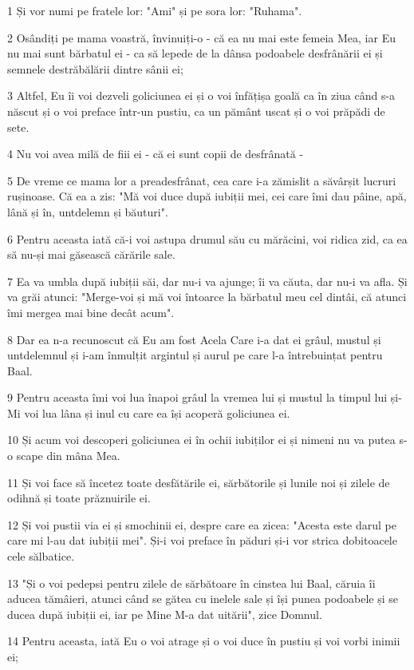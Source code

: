 \par 1 Și vor numi pe fratele lor: "Ami" și pe sora lor: "Ruhama".
\par 2 Osândiți pe mama voastră, învinuiți-o - că ea nu mai este femeia Mea, iar Eu nu mai sunt bărbatul ei - ca să lepede de la dânsa podoabele desfrânării ei și semnele destrăbălării dintre sânii ei;
\par 3 Altfel, Eu îi voi dezveli goliciunea ei și o voi înfățișa goală ca în ziua când s-a născut și o voi preface într-un pustiu, ca un pământ uscat și o voi prăpădi de sete.
\par 4 Nu voi avea milă de fiii ei - că ei sunt copii de desfrânată -
\par 5 De vreme ce mama lor a preadesfrânat, cea care i-a zămislit a săvârșit lucruri rușinoase. Că ea a zis: "Mă voi duce după iubiții mei, cei care îmi dau pâine, apă, lână și în, untdelemn și băuturi".
\par 6 Pentru aceasta iată că-i voi astupa drumul său cu mărăcini, voi ridica zid, ca ea să nu-și mai găsească cărările sale.
\par 7 Ea va umbla după iubiții săi, dar nu-i va ajunge; îi va căuta, dar nu-i va afla. Și va grăi atunci: "Merge-voi și mă voi întoarce la bărbatul meu cel dintâi, că atunci îmi mergea mai bine decât acum".
\par 8 Dar ea n-a recunoscut că Eu am fost Acela Care i-a dat ei grâul, mustul și untdelemnul și i-am înmulțit argintul și aurul pe care l-a întrebuințat pentru Baal.
\par 9 Pentru aceasta îmi voi lua înapoi grâul la vremea lui și mustul la timpul lui și-Mi voi lua lâna și inul cu care ea își acoperă goliciunea ei.
\par 10 Și acum voi descoperi goliciunea ei în ochii iubiților ei și nimeni nu va putea s-o scape din mâna Mea.
\par 11 Și voi face să încetez toate desfătările ei, sărbătorile și lunile noi și zilele de odihnă și toate prăznuirile ei.
\par 12 Și voi pustii via ei și smochinii ei, despre care ea zicea: "Acesta este darul pe care mi l-au dat iubiții mei". Și-i voi preface în păduri și-i vor strica dobitoacele cele sălbatice.
\par 13 "Și o voi pedepsi pentru zilele de sărbătoare în cinstea lui Baal, căruia îi aducea tămâieri, atunci când se gătea cu inelele sale și își punea podoabele și se ducea după iubiții ei, iar pe Mine M-a dat uitării", zice Domnul.
\par 14 Pentru aceasta, iată Eu o voi atrage și o voi duce în pustiu și voi vorbi inimii ei;
